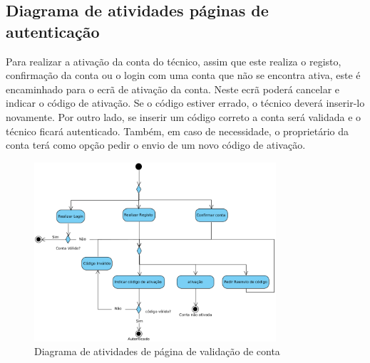 \newpage

\subsection{Diagrama de atividades páginas de autenticação}

Para realizar a ativação da conta do técnico, assim que este realiza o registo, confirmação da conta ou o login com uma conta que não se encontra ativa, este é encaminhado para o ecrã de ativação da conta. Neste ecrã poderá cancelar e indicar o código de ativação. Se o código estiver errado, o técnico deverá inserir-lo novamente. Por outro lado, se inserir um código correto a conta será validada e o técnico ficará autenticado. Também, em caso de necessidade, o proprietário da conta terá como opção pedir o envio de um novo código de ativação.

\begin{figure}[htb]
    \centering
    \includegraphics[width=0.8\textwidth]{images/diagramas/atividades/diagrama_atividades_autenticação.png}
    \caption{Diagrama de atividades de página de validação de conta}
    \label{fig:39}
\end{figure}

\newpage



